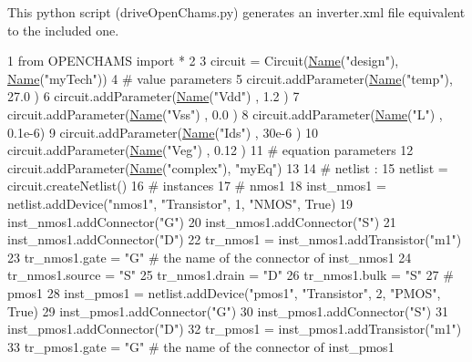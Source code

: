 This python script ({\ttfamily drive\-Open\-Chams.\-py}) generates an inverter.\-xml file equivalent to the included one. 
\begin{DoxyCodeInclude}
1 \textcolor{keyword}{from} OPENCHAMS \textcolor{keyword}{import} *
2 
3 circuit = Circuit(\hyperlink{class_name}{Name}(\textcolor{stringliteral}{"design"}), \hyperlink{class_name}{Name}(\textcolor{stringliteral}{"myTech"}))
4 \textcolor{comment}{# value parameters}
5 circuit.addParameter(\hyperlink{class_name}{Name}(\textcolor{stringliteral}{"temp"}), 27.0  )
6 circuit.addParameter(\hyperlink{class_name}{Name}(\textcolor{stringliteral}{"Vdd"}) , 1.2   )
7 circuit.addParameter(\hyperlink{class_name}{Name}(\textcolor{stringliteral}{"Vss"}) , 0.0   )
8 circuit.addParameter(\hyperlink{class_name}{Name}(\textcolor{stringliteral}{"L"})   , 0.1e-6)
9 circuit.addParameter(\hyperlink{class_name}{Name}(\textcolor{stringliteral}{"Ids"}) , 30e-6 )
10 circuit.addParameter(\hyperlink{class_name}{Name}(\textcolor{stringliteral}{"Veg"}) , 0.12  )
11 \textcolor{comment}{# equation parameters}
12 circuit.addParameter(\hyperlink{class_name}{Name}(\textcolor{stringliteral}{"complex"}), \textcolor{stringliteral}{"myEq"})
13 
14 \textcolor{comment}{# netlist :}
15 netlist = circuit.createNetlist()
16 \textcolor{comment}{#  instances}
17 \textcolor{comment}{#   nmos1}
18 inst\_nmos1 = netlist.addDevice(\textcolor{stringliteral}{"nmos1"}, \textcolor{stringliteral}{"Transistor"}, 1, \textcolor{stringliteral}{"NMOS"}, \textcolor{keyword}{True})
19 inst\_nmos1.addConnector(\textcolor{stringliteral}{"G"})
20 inst\_nmos1.addConnector(\textcolor{stringliteral}{"S"})
21 inst\_nmos1.addConnector(\textcolor{stringliteral}{"D"})
22 tr\_nmos1 = inst\_nmos1.addTransistor(\textcolor{stringliteral}{"m1"})
23 tr\_nmos1.gate   = \textcolor{stringliteral}{"G"} \textcolor{comment}{# the name of the connector of inst\_nmos1}
24 tr\_nmos1.source = \textcolor{stringliteral}{"S"}
25 tr\_nmos1.drain  = \textcolor{stringliteral}{"D"}
26 tr\_nmos1.bulk   = \textcolor{stringliteral}{"S"}
27 \textcolor{comment}{#   pmos1}
28 inst\_pmos1 = netlist.addDevice(\textcolor{stringliteral}{"pmos1"}, \textcolor{stringliteral}{"Transistor"}, 2, \textcolor{stringliteral}{"PMOS"}, \textcolor{keyword}{True})
29 inst\_pmos1.addConnector(\textcolor{stringliteral}{"G"})
30 inst\_pmos1.addConnector(\textcolor{stringliteral}{"S"})
31 inst\_pmos1.addConnector(\textcolor{stringliteral}{"D"})
32 tr\_pmos1 = inst\_pmos1.addTransistor(\textcolor{stringliteral}{"m1"})
33 tr\_pmos1.gate   = \textcolor{stringliteral}{"G"} \textcolor{comment}{# the name of the connector of inst\_pmos1}

\end{DoxyCodeInclude}
